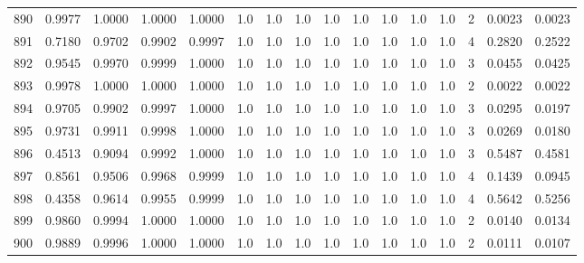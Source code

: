 \begin{tabular}{lrrrrrrrrrrrrrrr}
890 &      0.9977 &  1.0000 &  1.0000 &  1.0000 &     1.0 &     1.0 &     1.0 &     1.0 &     1.0 &     1.0 &      1.0 &        1.0 &      2 &                    0.0023 &                     0.0023 \\
891 &      0.7180 &  0.9702 &  0.9902 &  0.9997 &     1.0 &     1.0 &     1.0 &     1.0 &     1.0 &     1.0 &      1.0 &        1.0 &      4 &                    0.2820 &                     0.2522 \\
892 &      0.9545 &  0.9970 &  0.9999 &  1.0000 &     1.0 &     1.0 &     1.0 &     1.0 &     1.0 &     1.0 &      1.0 &        1.0 &      3 &                    0.0455 &                     0.0425 \\
893 &      0.9978 &  1.0000 &  1.0000 &  1.0000 &     1.0 &     1.0 &     1.0 &     1.0 &     1.0 &     1.0 &      1.0 &        1.0 &      2 &                    0.0022 &                     0.0022 \\
894 &      0.9705 &  0.9902 &  0.9997 &  1.0000 &     1.0 &     1.0 &     1.0 &     1.0 &     1.0 &     1.0 &      1.0 &        1.0 &      3 &                    0.0295 &                     0.0197 \\
895 &      0.9731 &  0.9911 &  0.9998 &  1.0000 &     1.0 &     1.0 &     1.0 &     1.0 &     1.0 &     1.0 &      1.0 &        1.0 &      3 &                    0.0269 &                     0.0180 \\
896 &      0.4513 &  0.9094 &  0.9992 &  1.0000 &     1.0 &     1.0 &     1.0 &     1.0 &     1.0 &     1.0 &      1.0 &        1.0 &      3 &                    0.5487 &                     0.4581 \\
897 &      0.8561 &  0.9506 &  0.9968 &  0.9999 &     1.0 &     1.0 &     1.0 &     1.0 &     1.0 &     1.0 &      1.0 &        1.0 &      4 &                    0.1439 &                     0.0945 \\
898 &      0.4358 &  0.9614 &  0.9955 &  0.9999 &     1.0 &     1.0 &     1.0 &     1.0 &     1.0 &     1.0 &      1.0 &        1.0 &      4 &                    0.5642 &                     0.5256 \\
899 &      0.9860 &  0.9994 &  1.0000 &  1.0000 &     1.0 &     1.0 &     1.0 &     1.0 &     1.0 &     1.0 &      1.0 &        1.0 &      2 &                    0.0140 &                     0.0134 \\
900 &      0.9889 &  0.9996 &  1.0000 &  1.0000 &     1.0 &     1.0 &     1.0 &     1.0 &     1.0 &     1.0 &      1.0 &        1.0 &      2 &                    0.0111 &                     0.0107 \\

\end{tabular}
